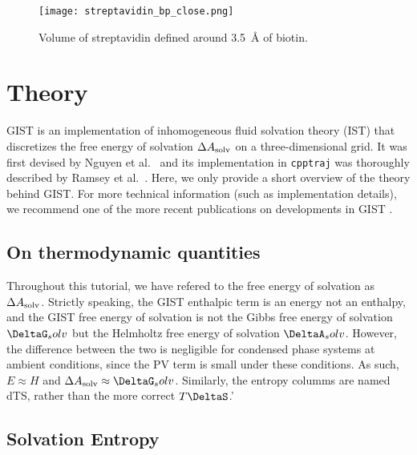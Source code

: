 \documentclass[9pt,tutorial]{livecoms}
\newcommand{\dasolv}{\Delta A_\textup{solv}}
\newcommand{\software}{\texttt}
\begin{document}
\begin{figure}
	\centering
	\texttt{[image: streptavidin\_bp\_close.png]}
	\caption{Volume of streptavidin defined around \SI{3.5}{\angstrom} of biotin. }\label{streptavidin_volume}
\end{figure}

\pagebreak %
\section{Theory}
\label{sec:theory}
GIST is an implementation of inhomogeneous fluid solvation theory (IST) \cite{Lazaridis1998} that discretizes the free energy of solvation $\dasolv$ on a three-dimensional grid. 
It was first devised by Nguyen et al.\ \cite{Nguyen2012} and its implementation in \software{cpptraj} was thoroughly described by Ramsey et al.\ \cite{Ramsey2016}.
Here, we only provide a short overview of the theory behind GIST.
For more technical information (such as implementation details), we recommend one of the more recent publications on developments in GIST \cite{Kraml2020,Chen2021,Roe2023-mpi-gist}.
\subsection{On thermodynamic quantities}
Throughout this tutorial, we have refered to the free energy of solvation as $\dasolv$.
Strictly speaking, the GIST enthalpic term is an energy not an enthalpy, and the GIST free energy of solvation is not the Gibbs free energy of solvation $\DeltaG_solv$ but the Helmholtz free energy of solvation $\DeltaA_solv$.
However, the difference between the two is negligible for condensed phase systems at ambient conditions, since the PV term is small under these conditions.
As such, $E \approx H$ and $\dasolv \approx \DeltaG_solv$.
Similarly, the entropy columms are named dTS, rather than the more correct $T\DeltaS$.'
\subsection{Solvation Entropy}
\end{document}

